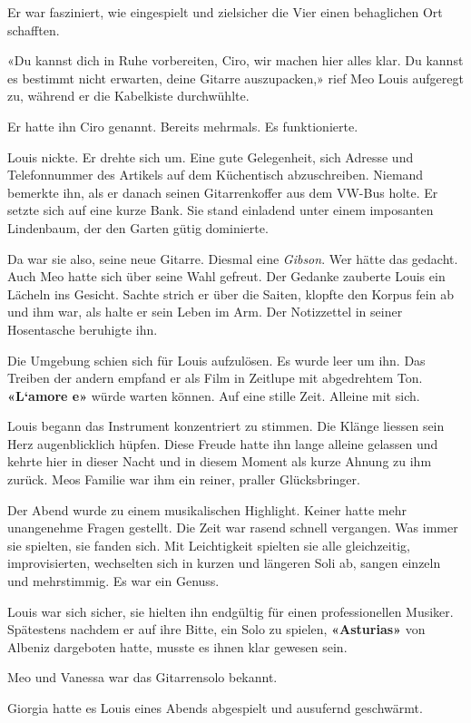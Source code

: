 Er war fasziniert, wie eingespielt und zielsicher die Vier einen
behaglichen Ort schafften.

«Du kannst dich in Ruhe vorbereiten, Ciro, wir machen hier alles klar.
Du kannst es bestimmt nicht erwarten, deine Gitarre auszupacken,» rief
Meo Louis aufgeregt zu, während er die Kabelkiste durchwühlte.

Er hatte ihn Ciro genannt. Bereits mehrmals. Es funktionierte.

Louis nickte. Er drehte sich um. Eine gute Gelegenheit, sich Adresse und
Telefonnummer des Artikels auf dem Küchentisch abzuschreiben. Niemand
bemerkte ihn, als er danach seinen Gitarrenkoffer aus dem VW-Bus holte.
Er setzte sich auf eine kurze Bank. Sie stand einladend unter einem
imposanten Lindenbaum, der den Garten gütig dominierte.

Da war sie also, seine neue Gitarre. Diesmal eine \emph{Gibson}. Wer
hätte das gedacht. Auch Meo hatte sich über seine Wahl gefreut. Der
Gedanke zauberte Louis ein Lächeln ins Gesicht. Sachte strich er über
die Saiten, klopfte den Korpus fein ab und ihm war, als halte er sein
Leben im Arm. Der Notizzettel in seiner Hosentasche beruhigte ihn.

Die Umgebung schien sich für Louis aufzulösen. Es wurde leer um ihn. Das
Treiben der andern empfand er als Film in Zeitlupe mit abgedrehtem Ton.
\textbf{«L`amore e»} würde warten können. Auf eine stille Zeit. Alleine
mit sich.

Louis begann das Instrument konzentriert zu stimmen. Die Klänge liessen
sein Herz augenblicklich hüpfen. Diese Freude hatte ihn lange alleine
gelassen und kehrte hier in dieser Nacht und in diesem Moment als kurze
Ahnung zu ihm zurück. Meos Familie war ihm ein reiner, praller
Glücksbringer.

Der Abend wurde zu einem musikalischen Highlight. Keiner hatte mehr
unangenehme Fragen gestellt. Die Zeit war rasend schnell vergangen. Was
immer sie spielten, sie fanden sich. Mit Leichtigkeit spielten sie alle
gleichzeitig, improvisierten, wechselten sich in kurzen und längeren
Soli ab, sangen einzeln und mehrstimmig. Es war ein Genuss.

Louis war sich sicher, sie hielten ihn endgültig für einen
professionellen Musiker. Spätestens nachdem er auf ihre Bitte, ein Solo
zu spielen, \textbf{«Asturias»} von Albeniz dargeboten hatte, musste es
ihnen klar gewesen sein.

Meo und Vanessa war das Gitarrensolo bekannt.

Giorgia hatte es Louis eines Abends abgespielt und ausufernd geschwärmt.

